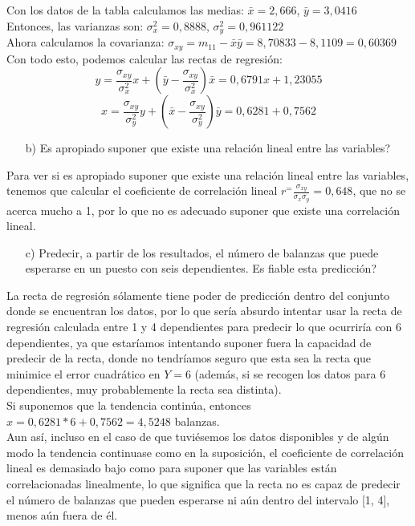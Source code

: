 \documentclass[a4paper,12pt]{article}
\begin{document}
Con los datos de la tabla calculamos las medias: $\bar x = 2,666$, $\bar y = 3,0416$\\
Entonces, las varianzas son: $\sigma_x^2 = 0,8888$, $\sigma_y^2 = 0,961122$\\
Ahora calculamos la covarianza: $\sigma_{xy}=m_{11} - \bar x \bar y = 8,70833 - 8,1109 = 0,60369$\\
Con todo esto, podemos calcular las rectas de regresión:\\
\[y = \frac{\sigma_{xy}}{\sigma_x^2}x+(\bar y -\frac{\sigma_{xy}}{\sigma_x^2})\bar x = 0,6791x+1,23055\]
\[x = \frac{\sigma_{xy}}{\sigma_y^2}y+(\bar x -\frac{\sigma_{xy}}{\sigma_y^2})\bar y = 0,6281+0,7562\]

\begin{enumerate}
    \item[b)] \textquestiondown Es apropiado suponer que existe una relación lineal entre las variables?
\end{enumerate}

Para ver si es apropiado suponer que existe una relación lineal entre las variables, tenemos que calcular el coeficiente de correlación lineal $r^=\frac{\sigma_{xy}}{\sigma_x\sigma_y} = 0,648$, que no se acerca mucho a 1, por lo que no es adecuado suponer que existe una correlación lineal.\\

\begin{enumerate}
    \item[c)] Predecir, a partir de los resultados, el número de balanzas que puede esperarse en un puesto con seis dependientes. \textquestiondown Es fiable esta predicción?
\end{enumerate}

La recta de regresión sólamente tiene poder de predicción dentro del conjunto donde se encuentran los datos, por lo que sería absurdo intentar usar la recta de regresión calculada entre 1 y 4 dependientes para predecir lo que ocurriría con 6 dependientes, ya que estaríamos intentando suponer fuera la capacidad de predecir de la recta, donde no tendríamos seguro que esta sea la recta que minimice el error cuadrático en $Y=6$ (además, si se recogen los datos para 6 dependientes, muy probablemente la recta sea distinta).\\

Si suponemos que  la tendencia continúa, entonces $x= 0,6281 * 6 + 0,7562 = 4,5248$ balanzas.\\

Aun así, incluso en el caso de que tuviésemos los datos disponibles y de algún modo la tendencia continuase como en la suposición, el coeficiente de correlación lineal es demasiado bajo como para suponer que las variables están correlacionadas linealmente, lo que significa que la recta no es capaz de predecir el número de balanzas que pueden esperarse ni aún dentro del intervalo [1, 4], menos aún fuera de él.\\
\end{document}
